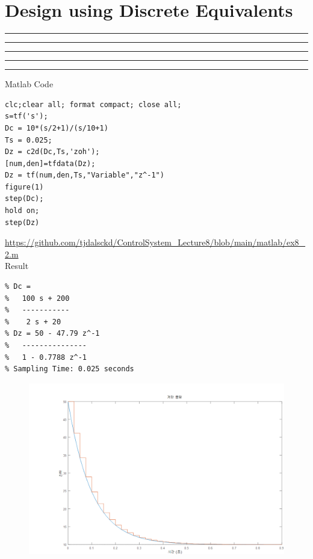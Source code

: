 \setcounter{chapter}{7}
\setcounter{section}{2}
\section{Design using Discrete Equivalents}
\vspace{-8pt} \hrule \hrule \hrule \hrule \hrule  \vspace{12pt}
Matlab Code
\begin{lstlisting}
clc;clear all; format compact; close all;
s=tf('s');
Dc = 10*(s/2+1)/(s/10+1)
Ts = 0.025;
Dz = c2d(Dc,Ts,'zoh');
[num,den]=tfdata(Dz);
Dz = tf(num,den,Ts,"Variable","z^-1")
figure(1)
step(Dc);
hold on;
step(Dz)
\end{lstlisting}
\url{https://github.com/tjdalsckd/ControlSystem_Lecture8/blob/main/matlab/ex8_2.m}\\
Result
\begin{lstlisting}
% Dc =
%   100 s + 200
%   -----------
%    2 s + 20
% Dz = 50 - 47.79 z^-1
%   ---------------
%   1 - 0.7788 z^-1 
% Sampling Time: 0.025 seconds
\end{lstlisting}
\newpage
\begin{figure}[h]
	\centering
	\includegraphics[width=20cm]{./FIG_Franklin/fig8-smc9.png}
\end{figure}